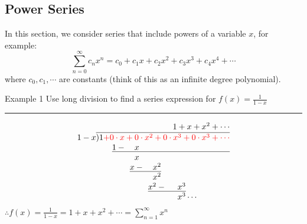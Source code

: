 \documentclass[12pt,a4paper]{article}
\begin{document}
\subsection{Power Series}\label{power}
In this section, we consider series that include powers of a variable $x$, for example: 
$$\sum_{n=0}^\infty c_n x^n=c_0+c_1x+c_2x^2+c_3x^3+c_4x^4+\cdots$$
where $c_0, c_1, \cdots$ are constants (think of this as an infinite degree polynomial).
\begin{eg}{Example 1}
	Use long division to find a series expression for $\displaystyle f(x)=\frac{1}{1-x}$\\
	\noindent\rule[0.25\baselineskip]{\textwidth}{1pt}
	$$\begin{array}{lr} 
		& 1+x+x^2+\cdots \\ 
		1-x  \!\!\!\!\!\! & \overline{)1{\color{red}{+ 0\cdot x+0\cdot x^2+0\cdot x^3+0\cdot x^3+\cdots}}} \\ 
		& \underline{1-\ \ \ x\qquad\qquad\qquad\qquad\qquad\quad} \\ 
		& x \qquad\qquad\qquad\qquad\qquad\quad\\
		& \underline{x-\ \ \ x^2}\qquad\qquad\qquad\qquad\ \\ 
		& x^2\qquad\qquad\qquad\qquad\ \\
		& \underline{x^2-\ \ \ \ x^3}\qquad\qquad\quad\ \\
		& x^3\cdots\qquad\qquad
	\end{array}$$
	$\displaystyle\therefore f(x)=\frac{1}{1-x}=1+x+x^2+\cdots=\sum_{n=1}^\infty x^n$\\
	{\color{red}{Notice: For the series to converge, we need $|x|<1$.\\ In this case, $x^3,\ x^4,\ \cdots$ approach zero.}}
\end{eg}
\end{document}
